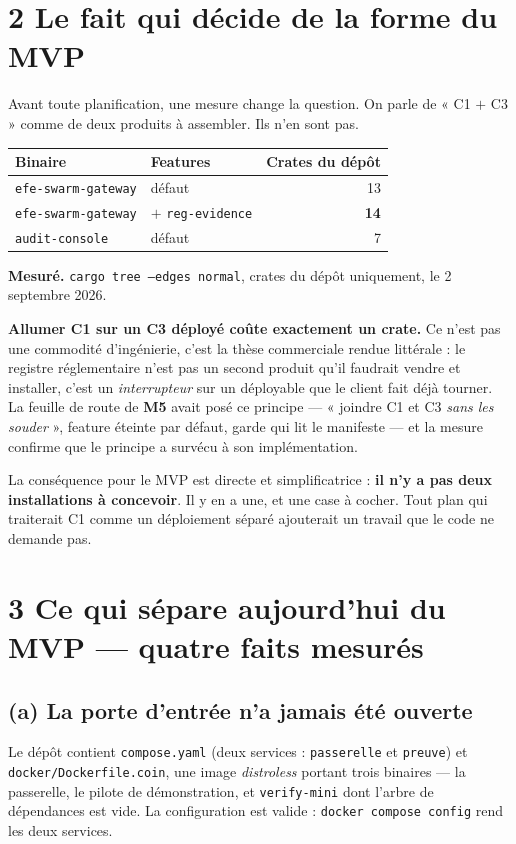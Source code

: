 \documentclass[11pt]{article}
\newcommand{\code}[1]{\texttt{\small #1}}
\newcommand{\best}[1]{{\color{efesolve}\textbf{#1}}}
\newcommand{\mm}[1]{\textbf{#1}}
\newcommand{\mesure}[1]{{\color{efeteal}\textbf{Mesuré.} }#1\par}
\begin{document}
\section{2 \;\textbar\; Le fait qui décide de la forme du MVP}

Avant toute planification, une mesure change la question. On parle de « C1 $+$ C3 » comme de deux
produits à assembler. Ils n'en sont pas.

\begin{center}\small
\renewcommand{\arraystretch}{1.2}
\begin{tabular}{@{}l l r@{}}
\toprule
\textbf{Binaire} & \textbf{Features} & \textbf{Crates du dépôt} \\
\midrule
\code{efe-swarm-gateway} & défaut & 13 \\
\code{efe-swarm-gateway} & $+$ \code{reg-evidence} & \best{14} \\
\code{audit-console} & défaut & 7 \\
\bottomrule
\end{tabular}
\end{center}

\mesure{\code{cargo tree --edges normal}, crates du dépôt uniquement, le 2 septembre 2026.}

\textbf{Allumer C1 sur un C3 déployé coûte exactement un crate.} Ce n'est pas une commodité
d'ingénierie, c'est la thèse commerciale rendue littérale : le registre réglementaire n'est pas un
second produit qu'il faudrait vendre et installer, c'est un \emph{interrupteur} sur un déployable que
le client fait déjà tourner. La feuille de route de \mm{M5} avait posé ce principe --- « joindre C1 et
C3 \emph{sans les souder} », feature éteinte par défaut, garde qui lit le manifeste --- et la mesure
confirme que le principe a survécu à son implémentation.

La conséquence pour le MVP est directe et simplificatrice : \textbf{il n'y a pas deux installations à
concevoir}. Il y en a une, et une case à cocher. Tout plan qui traiterait C1 comme un déploiement
séparé ajouterait un travail que le code ne demande pas.

\section{3 \;\textbar\; Ce qui sépare aujourd'hui du MVP --- quatre faits mesurés}

\subsection{(a) La porte d'entrée n'a jamais été ouverte}
Le dépôt contient \code{compose.yaml} (deux services : \code{passerelle} et \code{preuve}) et
\code{docker/Dockerfile.coin}, une image \emph{distroless} portant trois binaires --- la passerelle,
le pilote de démonstration, et \code{verify-mini} dont l'arbre de dépendances est vide. La
configuration est valide : \code{docker compose config} rend les deux services.
\end{document}
